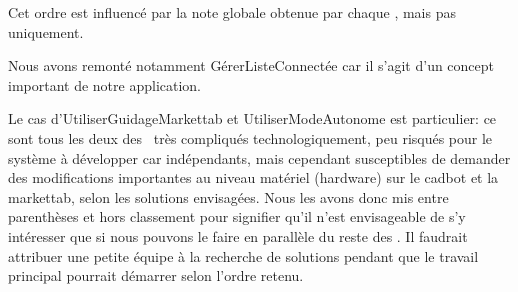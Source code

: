 Cet ordre est influencé par la note globale obtenue par chaque \cu, mais pas uniquement. 
\par
Nous avons remonté notamment GérerListeConnectée car il s'agit d'un concept important de notre application. 
\par
Le cas d'UtiliserGuidageMarkettab et UtiliserModeAutonome est particulier: ce sont tous les deux des \cu\ très compliqués technologiquement, peu risqués pour le système à développer car indépendants, mais cependant susceptibles de demander des modifications importantes au niveau matériel (hardware) sur le cadbot et la markettab, selon les solutions envisagées.
Nous les avons donc mis entre parenthèses et hors classement pour signifier qu'il n'est envisageable de s'y intéresser que si nous pouvons le faire en parallèle du reste des \cu. 
Il faudrait attribuer une petite équipe à la recherche de solutions pendant que le travail principal pourrait démarrer selon l'ordre retenu.
